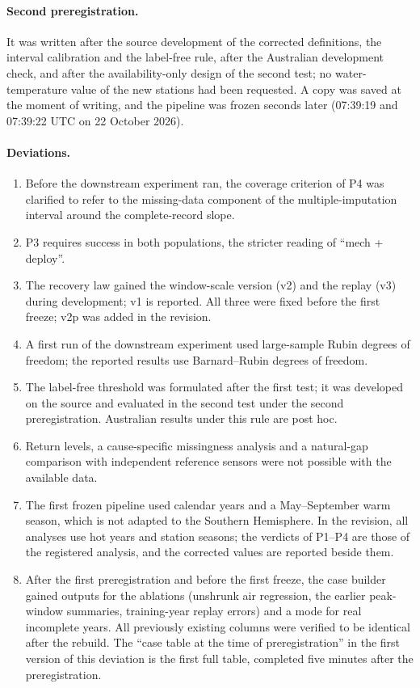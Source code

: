 \documentclass[draft]{agujournal2025}
\begin{document}
\paragraph{Second preregistration.} It was written after the source development of the corrected definitions, the interval calibration and the label-free rule, after the Australian development check, and after the availability-only design of the second test; no water-temperature value of the new stations had been requested. A copy was saved at the moment of writing, and the pipeline was frozen seconds later (07:39:19 and 07:39:22 UTC on 22 October 2026).

\paragraph{Deviations.}
\begin{enumerate}
\item Before the downstream experiment ran, the coverage criterion of P4 was clarified to refer to the missing-data component of the multiple-imputation interval around the complete-record slope.
\item P3 requires success in both populations, the stricter reading of ``mech + deploy''.
\item The recovery law gained the window-scale version (v2) and the replay (v3) during development; v1 is reported. All three were fixed before the first freeze; v2p was added in the revision.
\item A first run of the downstream experiment used large-sample Rubin degrees of freedom; the reported results use Barnard--Rubin degrees of freedom.
\item The label-free threshold was formulated after the first test; it was developed on the source and evaluated in the second test under the second preregistration. Australian results under this rule are post hoc.
\item Return levels, a cause-specific missingness analysis and a natural-gap comparison with independent reference sensors were not possible with the available data.
\item The first frozen pipeline used calendar years and a May--September warm season, which is not adapted to the Southern Hemisphere. In the revision, all analyses use hot years and station seasons; the verdicts of P1--P4 are those of the registered analysis, and the corrected values are reported beside them.
\item After the first preregistration and before the first freeze, the case builder gained outputs for the ablations (unshrunk air regression, the earlier peak-window summaries, training-year replay errors) and a mode for real incomplete years. All previously existing columns were verified to be identical after the rebuild. The ``case table at the time of preregistration'' in the first version of this deviation is the first full table, completed five minutes after the preregistration.

\end{enumerate}
\end{document}
